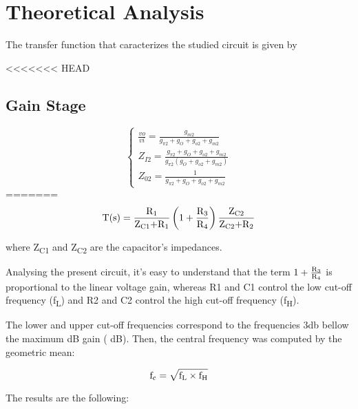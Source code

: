 \section{Theoretical Analysis} \label{sec:analysis}
 
The transfer function that caracterizes the studied circuit is given by

<<<<<<< HEAD

\subsection{Gain Stage}



\begin{equation}
 \begin{cases}
 \frac{vo}{vi}=\frac{g_{m2}}{g_{\pi 2}+g_O+g_{o2}+g_{m2}}\\
  Z_{I2}=\frac{g_{\pi 2}+g_O+g_{o2}+g_{m2}}{g_{\pi 2}(g_O+g_{o2}+g_{m2})}\\
  Z_{02}=\frac{1}{g_{\pi 2}+g_O+g_{o2}+g_{m2}}
 \end{cases}
\end{equation}
=======
\begin{equation} \label{eq:transfer}
 \text{T(s)}=\frac{\text{R\textsubscript1}}{\text{Z\textsubscript{C1}+R\textsubscript1}} \left( 1+\frac{\text{R\textsubscript3}}{\text{R\textsubscript4}}\right) \frac{\text{Z\textsubscript{C2}}}{\text{Z\textsubscript{C2}+R\textsubscript2}}
\end{equation}

where Z\textsubscript{C1} and Z\textsubscript{C2} are the capacitor's impedances.

Analysing the present circuit, it's easy to understand that the term $ 1+\frac{\text{R\textsubscript3}}{\text{R\textsubscript4}}$ is proportional to the linear voltage gain, whereas R1 and C1 control the low cut-off frequency (f\textsubscript{L}) and R2 and C2 control the high cut-off frequency (f\textsubscript{H}).

The lower and upper cut-off frequencies correspond to the frequencies 3db bellow the maximum dB gain ( dB). Then, the central frequency was computed by the geometric mean:

\begin{equation}
 \text{f\textsubscript{c}}= \sqrt{\text{f\textsubscript{L}} \times \text{f\textsubscript{H}}}
\end{equation}

The results are the following:

